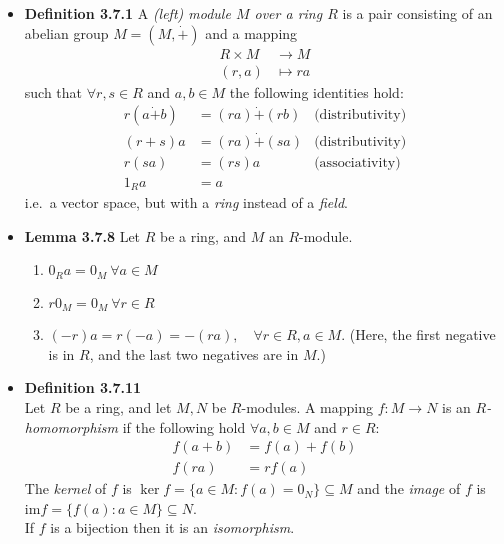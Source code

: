 \documentclass[11pt,a4paper]{article}
\begin{document}
\begin{itemize}
    \item \textbf{Definition 3.7.1}
        A \emph{(left) module $M$ over a ring $R$} is a pair consisting of an abelian group
        $M = (M, \dot{+})$ and a mapping
        \begin{align*}{}
            R \times M & \to M \\
            (r,a)      & \mapsto ra
        \end{align*}
        such that $\forall r,s \in R$ and $a,b \in M$ the following identities hold:
        \begin{align*}{}
            r(a \dot{+} b) & = (ra) \dot{+} (rb) & \text{(distributivity)} \\
            (r+s)a         & = (ra) \dot{+} (sa) & \text{(distributivity)}\\
            r(sa)          & = (rs)a             & \text{(associativity)}\\
            {1_R}a         & = a
        \end{align*}
        i.e.\ a vector space, but with a \emph{ring} instead of a \emph{field}.

    \item \textbf{Lemma 3.7.8} Let $R$ be a ring, and $M$ an $R$-module.
        \begin{enumerate}
            \item ${0_R}a = 0_M \ \forall a \in M$
            \item $r{0_M} = 0_M \ \forall r \in R$
            \item $(-r)a = r(-a) = -(ra), \quad \forall r \in R, a \in M$.
                (Here, the first negative is in $R$, and the last two negatives are in $M$.)
        \end{enumerate}

    \item \textbf{Definition 3.7.11} \\
        Let $R$ be a ring, and let $M,N$ be $R$-modules.
        A mapping $f : M \to N$ is an \emph{$R$-homomorphism} if the following hold
        $\forall a,b \in M$ and $r \in R$:
        \begin{align*}{}
            f(a+b) & = f(a) + f(b) \\
            f(ra)  & = rf(a)
        \end{align*}
        The \emph{kernel} of $f$ is $\ker f = \{a\in M : f(a) = 0_N \} \subseteq M$
        and the \emph{image} of $f$ is $\mathrm{im} f = \{f(a) : a \in M\} \subseteq N$. \\
        If $f$ is a bijection then it is an \emph{isomorphism}.


\end{itemize}
\end{document}
